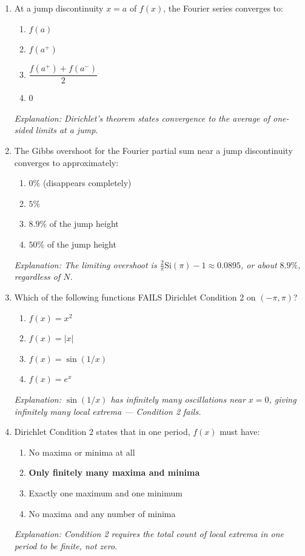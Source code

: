 \documentclass[12pt,a4paper]{article}
\begin{document}
\begin{enumerate}[label=\textbf{MCQ \arabic*.}]

\item At a jump discontinuity $x=a$ of $f(x)$, the Fourier series converges to:
   \begin{enumerate}[label=(\alph*)]
      \item $f(a)$
      \item $f(a^+)$
      \item \textbf{$\dfrac{f(a^+)+f(a^-)}{2}$}
      \item $0$
   \end{enumerate}
   \textit{Explanation: Dirichlet's theorem states convergence to the average of one-sided limits at a jump.}

\item The Gibbs overshoot for the Fourier partial sum near a jump discontinuity converges to approximately:
   \begin{enumerate}[label=(\alph*)]
      \item $0\%$ (disappears completely)
      \item $5\%$
      \item \textbf{$8.9\%$} of the jump height
      \item $50\%$ of the jump height
   \end{enumerate}
   \textit{Explanation: The limiting overshoot is $\frac{2}{\pi}\mathrm{Si}(\pi)-1 \approx 0.0895$, or about $8.9\%$, regardless of $N$.}

\item Which of the following functions FAILS Dirichlet Condition 2 on $(-\pi,\pi)$?
   \begin{enumerate}[label=(\alph*)]
      \item $f(x) = x^2$
      \item $f(x) = |x|$
      \item \textbf{$f(x) = \sin(1/x)$}
      \item $f(x) = e^x$
   \end{enumerate}
   \textit{Explanation: $\sin(1/x)$ has infinitely many oscillations near $x=0$, giving infinitely many local extrema --- Condition 2 fails.}

\item Dirichlet Condition 2 states that in one period, $f(x)$ must have:
   \begin{enumerate}[label=(\alph*)]
      \item No maxima or minima at all
      \item \textbf{Only finitely many maxima and minima}
      \item Exactly one maximum and one minimum
      \item No maxima and any number of minima
   \end{enumerate}
   \textit{Explanation: Condition 2 requires the total count of local extrema in one period to be finite, not zero.}


\end{enumerate}
\end{document}
